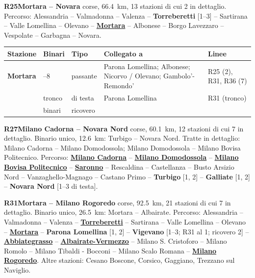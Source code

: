 \medskip\noindent\hypertarget{lin:R25}{\textbf{R25\enspace Mortara -- Novara}} corse, \SI{66,4}{\km}, 13 stazioni di cui 2 in dettaglio. Percorso: Alessandria -- Valmadonna -- Valenza -- \hypertarget{sta:S00039}{\textbf{Torreberetti}} [1--3] -- Sartirana -- Valle Lomellina -- Olevano -- \hyperlink{sta:S00034}{\textbf{Mortara}} -- Albonese -- Borgo Lavezzaro -- Vespolate -- Garbagna -- Novara.
{\footnotesize\setlength{\LTpre}{2pt}\setlength{\LTpost}{0pt}
\begin{longtable}{@{}>{\raggedright\arraybackslash}p{}>{\raggedright\arraybackslash}p{}>{\raggedright\arraybackslash}p{}>{\raggedright\arraybackslash}p{}>{\raggedright\arraybackslash}p{}@{}}
\toprule
Stazione & Binari & Tipo & Collegato a & Linee \\
\midrule
\endhead
\leavevmode\hypertarget{sta:S00034}{}\textbf{Mortara} & 1--8 & passante & Parona Lomellina; Albonese; Nicorvo / Olevano; Gambolo'-Remondo' & R25 (2), R31, R36 (7) \\
 & tronco & di testa & Parona Lomellina & R31 (tronco) \\
 & 2 binari & ricovero & & \\
\bottomrule
\end{longtable}}

\medskip\noindent\hypertarget{lin:R27}{\textbf{R27\enspace Milano Cadorna -- Novara Nord}} corse, \SI{60,1}{\km}, 12 stazioni di cui 7 in dettaglio. Binario unico, \SI{12,6}{\km}: Turbigo -- Novara Nord. Tratte in dettaglio: Milano Cadorna -- Milano Domodossola; Milano Domodossola -- Milano Bovisa Politecnico. Percorso: \hyperlink{sta:S01066}{\textbf{Milano Cadorna}} -- \hyperlink{sta:S01067}{\textbf{Milano Domodossola}} -- \hyperlink{sta:S01642}{\textbf{Milano Bovisa Politecnico}} -- \hyperlink{sta:S01933}{\textbf{Saronno}} -- Rescaldina -- Castellanza -- Busto Arsizio Nord -- Vanzaghello-Magnago -- Castano Primo -- \hypertarget{sta:S01751}{\textbf{Turbigo}} [1, 2] -- \hypertarget{sta:S01748}{\textbf{Galliate}} [1, 2] -- \hypertarget{sta:S00023}{\textbf{Novara Nord}} [1--3 di testa].

\medskip\noindent\hypertarget{lin:R31}{\textbf{R31\enspace Mortara -- Milano Rogoredo}} corse, \SI{92,5}{\km}, 21 stazioni di cui 7 in dettaglio. Binario unico, \SI{26,5}{\km}: Mortara -- Albairate. Percorso: Alessandria -- Valmadonna -- Valenza -- \hyperlink{sta:S00039}{\textbf{Torreberetti}} -- Sartirana -- Valle Lomellina -- Olevano -- \hyperlink{sta:S00034}{\textbf{Mortara}} -- \hypertarget{sta:S01060}{\textbf{Parona Lomellina}} [1, 2] -- \hypertarget{sta:S01061}{\textbf{Vigevano}} [1--3; R31 al 1; ricovero 2] -- \hyperlink{sta:S01062}{\textbf{Abbiategrasso}} -- \hyperlink{sta:S01059}{\textbf{Albairate-Vermezzo}} -- Milano S. Cristoforo -- Milano Romolo -- Milano Tibaldi - Bocconi -- Milano Scalo Romana -- \hyperlink{sta:S01820}{\textbf{Milano Rogoredo}}. Altre stazioni: Cesano Boscone, Corsico, Gaggiano, Trezzano sul Naviglio.


